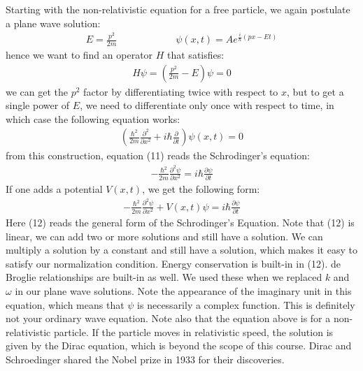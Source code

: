 \documentclass[11pt]{article}
\theoremstyle{break}
\theoremstyle{break}
\begin{document}
Starting with the non-relativistic equation for a free particle, we again postulate a plane wave solution:
\begin{align*}
E = \frac{p^2}{2m} \qquad\qquad\qquad \psi(x,t) = Ae^{\frac{i}{\hbar}(px-Et)}
\end{align*}
hence we want to find an operator $H$ that satisfies:
\begin{align*}
H\psi = \left( \frac{p^2}{2m}-E\right) \psi = 0
\end{align*}
we can get the $p^2$ factor by differentiating twice with respect to $x$, but to get a single power of $E$, we need to differentiate only once with respect to time, in which case the following equation works:
\begin{align}
\left( \frac{\hbar^2}{2m}\frac{\partial^2}{\partial x^2} + i\hbar \frac{\partial }{\partial t}\right) \psi(x,t) = 0
\end{align}
from this construction, equation (11) reads the Schrodinger's equation:
\begin{align*}
-\frac{\hbar^2}{2m}\frac{\partial^2\psi}{\partial x^2} = i\hbar \frac{\partial \psi}{\partial t}
\end{align*}
If one adds a potential $V(x,t)$, we get the following form:
\begin{align}
-\frac{\hbar^2}{2m}\frac{\partial^2 \psi}{\partial x^2} + V(x,t) \psi = i\hbar \frac{\partial \psi}{\partial t}
\end{align}
Here (12) reads the general form of the Schrodinger's Equation. Note that (12) is linear, we can add two or more solutions and still have a solution. We can multiply a solution by a constant and still have a solution, which makes it easy to satisfy our normalization condition. Energy conservation is built-in in (12). de Broglie relationships are built-in as well. We used these when we replaced $k$ and $\omega$ in our plane wave solutions.
Note the appearance of the imaginary unit in this equation, which means that $\psi$ is necessarily a complex function. This is definitely not your ordinary wave equation.
Note also that the equation above is for a non-relativistic particle. If the particle moves in relativistic speed, the solution is given by the  Dirac equation, which is beyond the scope of this course. Dirac and Schroedinger shared the Nobel prize in 1933 for their discoveries. \\
\end{document}
